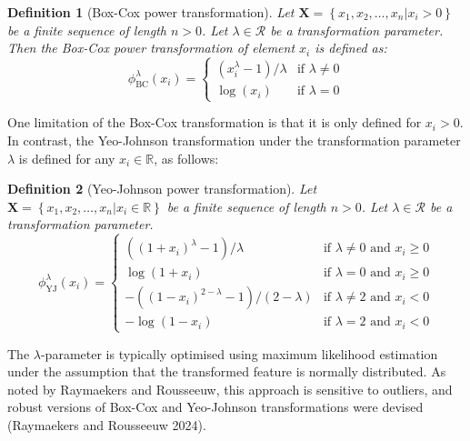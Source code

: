 \documentclass[
  a4paper,
]{article}
\newtheorem*{definition}{Definition}
\begin{document}
\begin{definition}[Box-Cox power transformation]
Let $\mathbf{X} = \left\{x_1, x_2, \ldots, x_n | x_i > 0 \right\}$ be a finite sequence of length $n > 0$.
Let $\lambda \in \mathcal{R}$ be a transformation parameter.
Then the Box-Cox power transformation of element $x_i$ is defined as:
\begin{equation}
\label{eqn:box-cox-original}
\phi_{\text{BC}}^\lambda (x_i) = 
\begin{cases}
\left(x_i^\lambda - 1 \right) / \lambda & \text{if } \lambda \neq 0\\
\log(x_i) & \text{if } \lambda = 0
\end{cases}
\end{equation}
\end{definition}

One limitation of the Box-Cox transformation is that it is only defined
for \(x_i > 0\). In contrast, the Yeo-Johnson transformation under the
transformation parameter \(\lambda\) is defined for any
\(x_i \in \mathbb{R}\), as follows:

\begin{definition}[Yeo-Johnson power transformation]
Let $\mathbf{X} = \left\{x_1, x_2, \ldots, x_n | x_i \in \mathbb{R} \right\}$ be a finite sequence of length $n > 0$.
Let $\lambda \in \mathcal{R}$ be a transformation parameter.
\begin{equation}
\label{eqn:yeo-johnson-original}
\phi_{\text{YJ}}^\lambda (x_i) = 
\begin{cases}
\left( \left( 1 + x_i \right)^\lambda - 1\right) / \lambda & \text{if } \lambda \neq 0 \text{ and } x_i \geq 0\\
\log(1 + x_i) & \text{if } \lambda = 0 \text{ and } x_i \geq 0\\
-\left( \left( 1 - x_i\right)^{2 - \lambda} - 1 \right) / \left(2 - \lambda \right) & \text{if } \lambda \neq 2 \text{ and } x_i < 0\\
-\log(1 - x_i) & \text{if } \lambda = 2 \text{ and } x_i < 0
\end{cases}
\end{equation}
\end{definition}

The \(\lambda\)-parameter is typically optimised using maximum
likelihood estimation under the assumption that the transformed feature
is normally distributed. As noted by Raymaekers and Rousseeuw, this
approach is sensitive to outliers, and robust versions of Box-Cox and
Yeo-Johnson transformations were devised (Raymaekers and Rousseeuw
2024).
\end{document}
